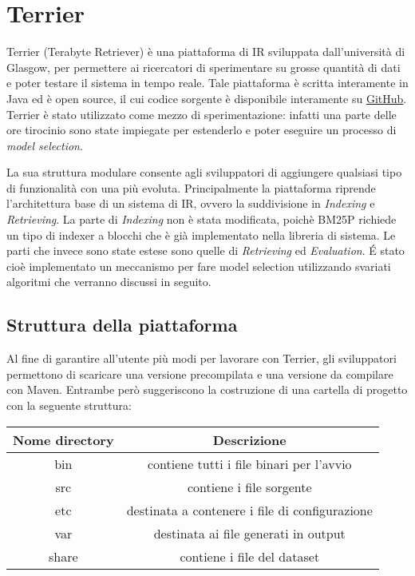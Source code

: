 \chapter{Terrier}
Terrier (Terabyte Retriever) è una piattaforma di IR sviluppata dall'università di Glasgow, per permettere ai ricercatori di sperimentare su
grosse quantità di dati e poter testare il sistema in tempo reale.
Tale piattaforma è scritta interamente in Java ed è open source, il cui codice sorgente è disponibile
interamente su \href{https://github.com/terrier-org/terrier-core}{GitHub}.
\\
Terrier è stato utilizzato come mezzo di sperimentazione: infatti
una parte delle ore tirocinio sono state impiegate per estenderlo e poter eseguire un processo
di \textit{model selection}.

La sua struttura modulare consente agli sviluppatori di aggiungere qualsiasi tipo di funzionalità con una
più evoluta.
Principalmente la piattaforma riprende l'architettura base di un sistema di IR, ovvero la suddivisione in
\textit{Indexing} e \textit{Retrieving}. La parte di \textit{Indexing} non è stata modificata, poichè
BM25P richiede un tipo di indexer a blocchi che è già implementato nella libreria di sistema.
Le parti che invece sono state estese sono quelle di \textit{Retrieving} ed \textit{Evaluation}. 
\'E stato cioè implementato un meccanismo per fare model selection utilizzando svariati algoritmi
che verranno discussi in seguito.

\section{Struttura della piattaforma}
Al fine di garantire all'utente più modi per lavorare con Terrier, gli sviluppatori
permettono di scaricare una versione precompilata e una versione da compilare con
Maven. Entrambe però suggeriscono la costruzione
di una cartella di progetto con la seguente struttura:

\pagebreak

\begin{table}[h]
	\centering
	\begin{tabular}{|c|c|}
		\hline
		\textbf{Nome directory} & \textbf{Descrizione} \\
		\hline
		bin & contiene tutti i file binari per l'avvio \\
		\hline
		src & contiene i file sorgente \\
		\hline
		etc & destinata a contenere i file di configurazione \\
		\hline
		var & destinata ai file generati in output \\
		\hline
		share & contiene i file del dataset \\
		\hline
	\end{tabular}
\end{table}

